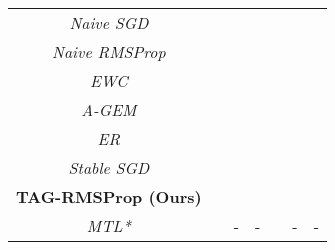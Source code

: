 \documentclass{article} \usepackage{collas2022_conference,times}
\begin{document}
\begin{table*}[t!]
{\begin{tabular}{c c c c c c c}
        \midrule
        \textit{Naive SGD} &  &  &   &  &  & \\
        \textit{Naive RMSProp} &   &  &  &  &  & \\
        \hline
        \textit{EWC}&  &  & &  &  & \\
        \textit{A-GEM} &   &  &  &  &  & \\
        \textit{ER} &   &  &  &  &  & \\
        \textit{Stable SGD} &  &  &  &  &  &  \\
        \hline
        \textbf{TAG-RMSProp (Ours)} &  &  &  &  &  & 
\\
        \hline
        \textit{MTL*} &   &  - & - &  &  - & - \\
        \hline
        \end{tabular}}
        \label{main_table_epochs}
    \end{table*}
\end{document}
